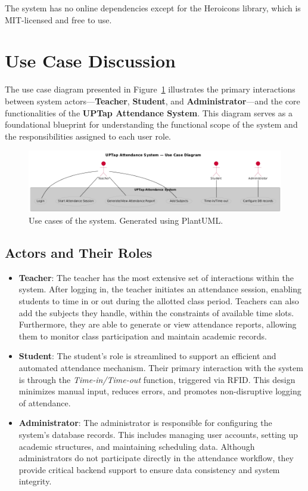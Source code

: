 The system has no online dependencies except for the Heroicons library, which is MIT-licensed and free to use.
\section{Use Case Discussion}

The use case diagram presented in Figure~\ref{fig:use_case} illustrates the primary interactions between system actors—\textbf{Teacher}, \textbf{Student}, and \textbf{Administrator}—and the core functionalities of the \textbf{UPTap Attendance System}. This diagram serves as a foundational blueprint for understanding the functional scope of the system and the responsibilities assigned to each user role.

\begin{figure}[h] %
	\centering
	\includegraphics[width=1\textwidth]{figures/chapter4/use_case_diagram.png} %
	\caption{Use cases of the system. Generated using PlantUML.}
	\label{fig:use_case}
\end{figure}
\clearpage

\subsection*{Actors and Their Roles}

\begin{itemize}
	\item \textbf{Teacher}: The teacher has the most extensive set of interactions within the system. After logging in, the teacher initiates an attendance session, enabling students to time in or out during the allotted class period. Teachers can also add the subjects they handle, within the constraints of available time slots. Furthermore, they are able to generate or view attendance reports, allowing them to monitor class participation and maintain academic records.
	
	\item \textbf{Student}: The student's role is streamlined to support an efficient and automated attendance mechanism. Their primary interaction with the system is through the \textit{Time-in/Time-out} function, triggered via RFID. This design minimizes manual input, reduces errors, and promotes non-disruptive logging of attendance.
	
	\item \textbf{Administrator}: The administrator is responsible for configuring the system’s database records. This includes managing user accounts, setting up academic structures, and maintaining scheduling data. Although administrators do not participate directly in the attendance workflow, they provide critical backend support to ensure data consistency and system integrity.
\end{itemize}


